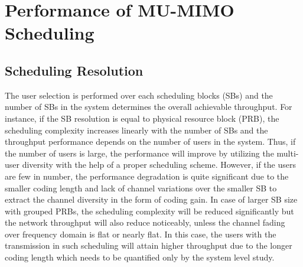 \documentclass[conference,letterpaper]{./../../IEEE/IEEEtran}
\begin{document}
\section{Performance of MU-MIMO Scheduling}
\label{sec:perf_scheduling}
\subsection{Scheduling Resolution}
The user selection is performed over each scheduling blocks (SBs) and the number of SBs in the system determines the overall achievable throughput. For instance, if the SB resolution is equal to physical resource block (PRB), the scheduling complexity increases linearly with the number of SBs and the throughput performance depends on the number of users in the system. Thus, if the number of users is large, the performance will improve by utilizing the multi-user diversity with the help of a proper scheduling scheme. However, if the users are few in number, the performance degradation is quite significant due to the smaller coding length and lack of channel variations over the smaller SB to extract the channel diversity in the form of coding gain. In case of larger SB size with grouped PRBs, the scheduling complexity will be reduced significantly but the network throughput will also reduce noticeably, unless the channel fading over frequency domain is flat or nearly flat. In this case, the users with the transmission in such scheduling will attain higher throughput due to the longer coding length which needs to be quantified only by the system level study.
\end{document}
